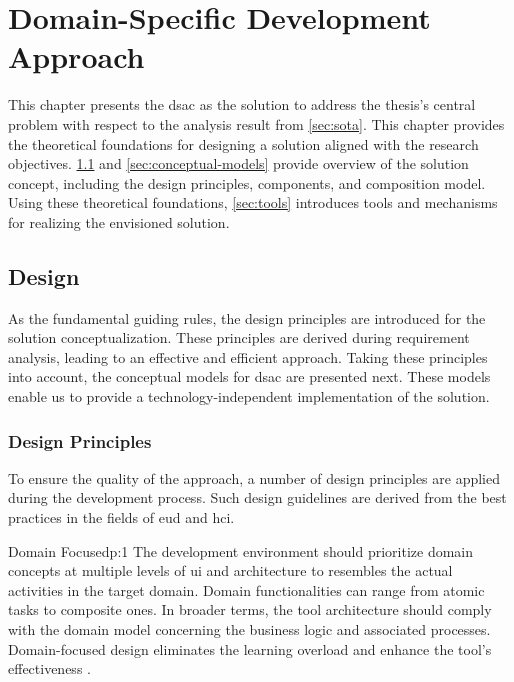 \hypertarget{sec:solution}{%
\chapter{Domain-Specific Development Approach }\label{sec:solution}}
This chapter presents the \gls{dsac} as the solution to address the thesis's central problem with respect to the analysis result from \cref{sec:sota}. This chapter provides the theoretical foundations for designing a solution aligned with the research objectives. \cref{sec:solution-design} and \cref{sec:conceptual-models} provide overview of the solution concept, including the design principles, components, and composition model. Using these theoretical foundations, \cref{sec:tools} introduces tools and mechanisms for realizing the envisioned solution.

\vspace{-15pt}
\hypertarget{sec:solution-design}{%
\section{Design}\label{sec:solution-design}}
As the fundamental guiding rules, the design principles are introduced for the solution conceptualization. These principles are derived during requirement analysis, leading to an effective and efficient approach. Taking these principles into account, the \gls{conceptual model}s for \gls{dsac} are presented next. These models enable us to provide a technology-independent implementation of the solution.

\vspace{-15pt}
\hypertarget{sec:principles}{%
\subsection{Design Principles}\label{sec:principles}}
\vspace{15pt}

To ensure the quality of the approach, a number of design principles are applied during the development process. Such design guidelines are derived from the best practices in the fields of \gls{eud} and \gls{hci}.


\vspace{-10pt}
\begin{thesisprinciple}{Domain Focused}{p:1}
The development environment should prioritize domain concepts at multiple levels of \gls{ui} and architecture to resembles the actual activities in the target domain. Domain functionalities can range from atomic tasks to composite ones. In broader terms, the tool architecture should comply with the domain model concerning the business logic and associated processes. Domain-focused design eliminates the learning overload and enhance the tool’s effectiveness \autocite{Imran2013}.  

\end{thesisprinciple}

